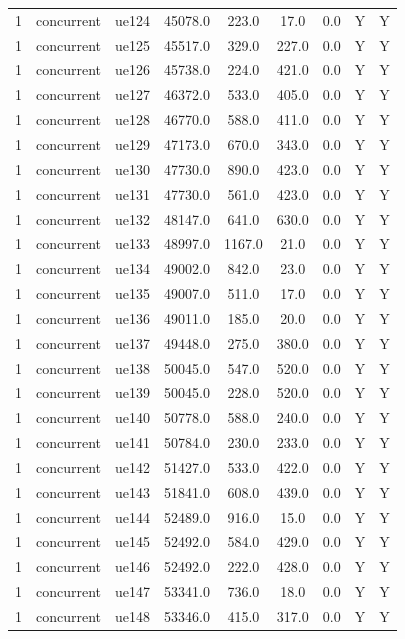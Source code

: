 \begin{table}[ht]
\begin{tabular}{|c|c|c|c|c|c|c|c|c|}
1 & concurrent & ue124 & 45078.0 & 223.0 & 17.0 & 0.0 & Y & Y \\
1 & concurrent & ue125 & 45517.0 & 329.0 & 227.0 & 0.0 & Y & Y \\
1 & concurrent & ue126 & 45738.0 & 224.0 & 421.0 & 0.0 & Y & Y \\
1 & concurrent & ue127 & 46372.0 & 533.0 & 405.0 & 0.0 & Y & Y \\
1 & concurrent & ue128 & 46770.0 & 588.0 & 411.0 & 0.0 & Y & Y \\
1 & concurrent & ue129 & 47173.0 & 670.0 & 343.0 & 0.0 & Y & Y \\
1 & concurrent & ue130 & 47730.0 & 890.0 & 423.0 & 0.0 & Y & Y \\
1 & concurrent & ue131 & 47730.0 & 561.0 & 423.0 & 0.0 & Y & Y \\
1 & concurrent & ue132 & 48147.0 & 641.0 & 630.0 & 0.0 & Y & Y \\
1 & concurrent & ue133 & 48997.0 & 1167.0 & 21.0 & 0.0 & Y & Y \\
1 & concurrent & ue134 & 49002.0 & 842.0 & 23.0 & 0.0 & Y & Y \\
1 & concurrent & ue135 & 49007.0 & 511.0 & 17.0 & 0.0 & Y & Y \\
1 & concurrent & ue136 & 49011.0 & 185.0 & 20.0 & 0.0 & Y & Y \\
1 & concurrent & ue137 & 49448.0 & 275.0 & 380.0 & 0.0 & Y & Y \\
1 & concurrent & ue138 & 50045.0 & 547.0 & 520.0 & 0.0 & Y & Y \\
1 & concurrent & ue139 & 50045.0 & 228.0 & 520.0 & 0.0 & Y & Y \\
1 & concurrent & ue140 & 50778.0 & 588.0 & 240.0 & 0.0 & Y & Y \\
1 & concurrent & ue141 & 50784.0 & 230.0 & 233.0 & 0.0 & Y & Y \\
1 & concurrent & ue142 & 51427.0 & 533.0 & 422.0 & 0.0 & Y & Y \\
1 & concurrent & ue143 & 51841.0 & 608.0 & 439.0 & 0.0 & Y & Y \\
1 & concurrent & ue144 & 52489.0 & 916.0 & 15.0 & 0.0 & Y & Y \\
1 & concurrent & ue145 & 52492.0 & 584.0 & 429.0 & 0.0 & Y & Y \\
1 & concurrent & ue146 & 52492.0 & 222.0 & 428.0 & 0.0 & Y & Y \\
1 & concurrent & ue147 & 53341.0 & 736.0 & 18.0 & 0.0 & Y & Y \\
1 & concurrent & ue148 & 53346.0 & 415.0 & 317.0 & 0.0 & Y & Y \\

\end{tabular}
\end{table}

